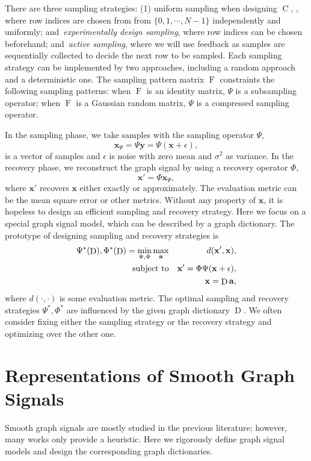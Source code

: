 \documentclass[journal,twocolumn,10pt]{IEEEtran}
\theoremstyle{definition}
\def\a{\mathbf{a}}
\def\x{\mathbf{x}}
\def\y{\mathbf{y}}
\DeclareMathOperator{\Cc}{C}
\DeclareMathOperator{\D}{D}
\DeclareMathOperator{\F}{F}
\begin{document}
There are three sampling strategies: (1) uniform sampling when designing $\Cc$, , where row indices are chosen from from $\{0, 1, \cdots, N-1\}$ independently and uniformly; and~\emph{experimentally design sampling}, where row indices can be chosen beforehand; and~\emph{active sampling}, where we will use feedback as samples are sequentially collected to decide the next row to be sampled. Each sampling strategy can be implemented by two approaches, including a random approach and a deterministic one. The sampling pattern matrix $\F$ constraints the following sampling patterns: when $\F$ is an identity matrix, $\Psi$ is a subsampling operator; when $\F$ is a Gaussian random matrix,  $\Psi$ is a compressed sampling operator.

In the sampling phase, we take
samples with the sampling operator $\Psi$,
\begin{equation*}
\x_{\Psi} = \Psi \y = \Psi ( \x  + \epsilon),
\end{equation*}
 is a vector of samples and $\epsilon$ is
noise with zero mean and $\sigma^2$ as variance. In the recovery phase, we
reconstruct the graph signal by using a recovery operator $\Phi$, 
\begin{equation*}
\x' = \Phi \x_{\Psi},
\end{equation*}
where $\x'$ recovers $\x$ either
exactly or approximately. The evaluation metric can be the mean square error or other metrics.  Without any property of $\x$, it is hopeless to design an efficient sampling and recovery strategy. Here we focus on a special graph signal model, which can be described by a graph dictionary.  The prototype of designing sampling and recovery strategies is
\begin{eqnarray*}
\Psi^*(\D), \Phi^*(\D) = \min_{\Psi, \Phi} \max_{\a} && d(\x', \x),
\\
 {\rm subject~to} && \x' = \Phi \Psi (\x + \epsilon),
\\
&& \x = \D \a,
\end{eqnarray*}
where $d(\cdot, \cdot)$ is some evaluation metric. The optimal sampling and recovery strategies $\Psi^*, \Phi^* $ are influenced by the given graph dictionary $\D$. We often consider fixing either the sampling strategy or the recovery strategy and optimizing over the other one.




\section{Representations of Smooth Graph Signals}
\label{sec:R_Smooth}
Smooth graph signals are mostly studied in the previous literature; however, many works only provide a heuristic. Here we rigorously define graph signal models and design the corresponding graph dictionaries.
\end{document}
